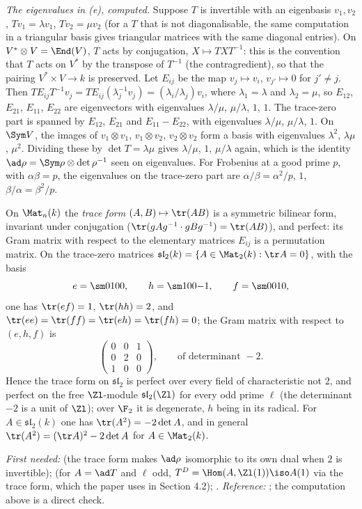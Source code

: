\emph{The eigenvalues in (e), computed.} Suppose $T$ is invertible with an eigenbasis $v_1,v_2$,
$Tv_1=\lambda v_1$, $Tv_2=\mu v_2$ (for a $T$ that is not diagonalisable, the same computation in a
triangular basis gives triangular matrices with the same diagonal entries). On $V^*\otimes V=\End(V)$, $T$ acts by
conjugation, $X\mapsto TXT^{-1}$: this is the convention that $T$ acts on $V^*$ by the transpose of
$T^{-1}$ (the contragredient), so that the pairing $V^*\times V\to k$ is preserved. Let $E_{ij}$ be
the map $v_j\mapsto v_i$, $v_{j'}\mapsto0$ for $j'\ne j$. Then
$TE_{ij}T^{-1}v_j=TE_{ij}(\lambda_j^{-1}v_j)=(\lambda_i/\lambda_j)v_i$, where $\lambda_1=\lambda$ and
$\lambda_2=\mu$, so $E_{12}$, $E_{21}$, $E_{11}$, $E_{22}$ are eigenvectors with eigenvalues
$\lambda/\mu$, $\mu/\lambda$, $1$, $1$. The trace-zero part is spanned by $E_{12}$, $E_{21}$ and
$E_{11}-E_{22}$, with eigenvalues $\lambda/\mu$, $\mu/\lambda$, $1$. On $\Sym V$, the images of
$v_1\otimes v_1$, $v_1\otimes v_2$, $v_2\otimes v_2$ form a basis with eigenvalues $\lambda^2$,
$\lambda\mu$, $\mu^2$. Dividing these by $\det T=\lambda\mu$ gives $\lambda/\mu$, $1$, $\mu/\lambda$
again, which is the identity $\ad\rho=\Sym\rho\otimes\det\rho^{-1}$ seen on eigenvalues. For
Frobenius at a good prime $p$, with $\alpha\beta=p$, the eigenvalues on the trace-zero part are
$\alpha/\beta=\alpha^2/p$, $1$, $\beta/\alpha=\beta^2/p$.

\begin{theorem}\label{thm:prereq:traceform}
On $\Mat_n(k)$ the \emph{trace form} $(A,B)\mapsto\tr(AB)$ is a symmetric bilinear form, invariant
under conjugation ($\tr(gAg^{-1}\cdot gBg^{-1})=\tr(AB)$), and perfect: its Gram matrix with
respect to the elementary matrices $E_{ij}$ is a permutation matrix. On the trace-zero matrices
$\mathfrak{sl}_2(k)=\{A\in\Mat_2(k):\tr A=0\}$, with the basis
\[
e=\sm0100,\qquad h=\sm100{-1},\qquad f=\sm0010,
\]
one has $\tr(ef)=1$, $\tr(hh)=2$, and $\tr(ee)=\tr(ff)=\tr(eh)=\tr(fh)=0$; the Gram matrix with
respect to $(e,h,f)$ is
\[
\begin{pmatrix}0&0&1\\0&2&0\\1&0&0\end{pmatrix},\qquad\text{of determinant }-2.
\]
Hence the trace form on $\mathfrak{sl}_2$ is perfect over every field of characteristic not $2$,
and perfect on the free $\Zl$-module $\mathfrak{sl}_2(\Zl)$ for every odd prime $\ell$ (the
determinant $-2$ is a unit of $\Zl$); over $\F_2$ it is degenerate, $h$ being in its radical.
For $A\in\mathfrak{sl}_2(k)$ one has $\tr(A^2)=-2\det A$, and in general $\tr(A^2)=(\tr A)^2-2\det A$
for $A\in\Mat_2(k)$.
\end{theorem}
\noindent\emph{First needed:}  (the trace form makes $\ad\rho$ isomorphic to its own
dual when $2$ is invertible);  (for $A=\ad T$ and $\ell$ odd,
$T^D=\Hom(A,\Zl(1))\iso A(1)$ via the trace form, which the paper uses in Section 4.2);
. \emph{Reference:} \cite[Chapter XV]{Lang}; the computation above is a direct
check.

